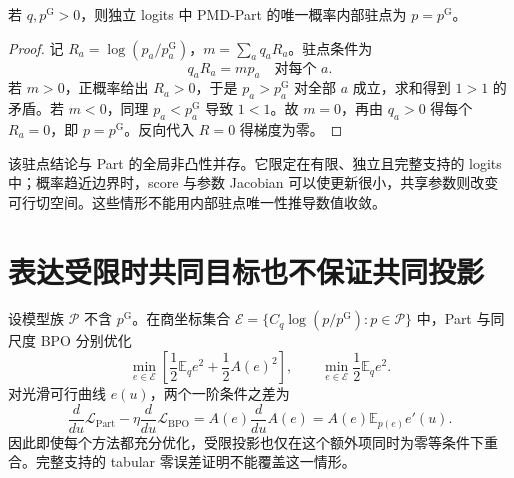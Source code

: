 \documentclass[lang=cn,scheme=chinese,openany]{../book/elegantbook}
\newcommand{\E}{\mathbb E}
\begin{document}
\begin{proposition}
\label{prop:geometry-part-stationary}
若 $q,p^{\mathrm G}>0$，则独立 logits 中 PMD-Part 的唯一概率内部驻点为 $p=p^{\mathrm G}$。
\end{proposition}
\begin{proof}
记 $R_a=\log(p_a/p_a^{\mathrm G})$，$m=\sum_aq_aR_a$。驻点条件为
\begin{equation}
q_aR_a=mp_a\quad\text{对每个 }a.
\end{equation}
若 $m>0$，正概率给出 $R_a>0$，于是 $p_a>p_a^{\mathrm G}$ 对全部 $a$ 成立，求和得到 $1>1$ 的矛盾。若 $m<0$，同理 $p_a<p_a^{\mathrm G}$ 导致 $1<1$。故 $m=0$，再由 $q_a>0$ 得每个 $R_a=0$，即 $p=p^{\mathrm G}$。反向代入 $R=0$ 得梯度为零。
\end{proof}

该驻点结论与 Part 的全局非凸性并存。它限定在有限、独立且完整支持的 logits 中；概率趋近边界时，score 与参数 Jacobian 可以使更新很小，共享参数则改变可行切空间。这些情形不能用内部驻点唯一性推导数值收敛。

\section{表达受限时共同目标也不保证共同投影}
\label{sec:geometry-restricted}
设模型族 $\mathcal P$ 不含 $p^{\mathrm G}$。在商坐标集合 $\mathcal E=\{C_q\log(p/p^{\mathrm G}):p\in\mathcal P\}$ 中，Part 与同尺度 BPO 分别优化
\begin{equation}
\min_{e\in\mathcal E}\left[\frac12\E_qe^2+\frac12A(e)^2\right],
\qquad \min_{e\in\mathcal E}\frac12\E_qe^2.
\end{equation}
对光滑可行曲线 $e(u)$，两个一阶条件之差为
\begin{equation}
\frac d{du}\mathcal L_{\mathrm{Part}}
-\eta\frac d{du}\mathcal L_{\mathrm{BPO}}
=A(e)\frac d{du}A(e)
=A(e)\E_{p(e)}e'(u).
\end{equation}
因此即使每个方法都充分优化，受限投影也仅在这个额外项同时为零等条件下重合。完整支持的 tabular 零误差证明不能覆盖这一情形。
\end{document}
